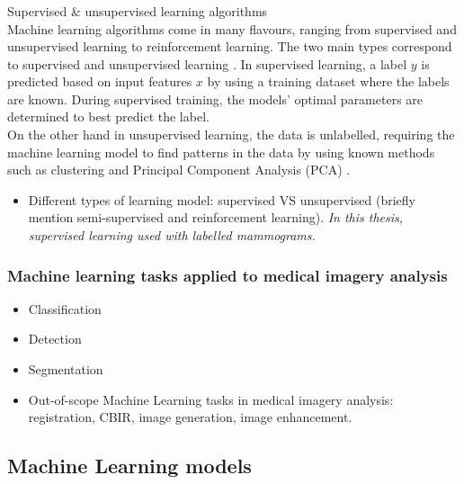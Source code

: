 \subsubsection{}{Supervised \& unsupervised learning algorithms}\\

Machine learning algorithms come in many flavours, ranging from supervised and unsupervised learning to reinforcement learning. The two main types correspond to supervised and unsupervised learning \cite{Geron2019}. In supervised learning, a label $y$ is predicted based on input features $x$ by using a training dataset where the labels are known. During supervised training, the models' optimal parameters are determined to best predict the label.\\

On the other hand in unsupervised learning, the data is unlabelled, requiring the machine learning model to find patterns in the data by using known methods such as clustering and Principal Component Analysis (PCA) \cite{Litjens2017}.

\begin{itemize}
    \item Different types of learning model: supervised VS unsupervised (briefly mention semi-supervised and reinforcement learning). \textit{In this thesis, supervised learning used with labelled mammograms.}
\end{itemize}

\subsubsection{Machine learning tasks applied to medical imagery analysis}

\begin{itemize}
    \item Classification
    \item Detection
    \item Segmentation
    \item Out-of-scope Machine Learning tasks in medical imagery analysis: registration, CBIR, image generation, image enhancement.
\end{itemize}

\subsection{Machine Learning models}

